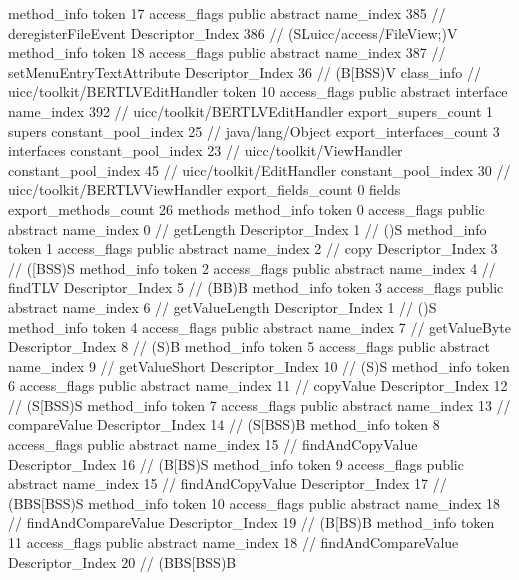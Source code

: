{{{{{				}
				method_info {
					token	17
					access_flags	public abstract
					name_index	385		// deregisterFileEvent
					Descriptor_Index	386		// (SLuicc/access/FileView;)V
				}
				method_info {
					token	18
					access_flags	public abstract
					name_index	387		// setMenuEntryTextAttribute
					Descriptor_Index	36		// (B[BSS)V
				}
			}
		}
		class_info {		// uicc/toolkit/BERTLVEditHandler
			token	10
			access_flags	public abstract interface
			name_index	392		// uicc/toolkit/BERTLVEditHandler
			export_supers_count	1
			supers {
				constant_pool_index	25		// java/lang/Object
			}
			export_interfaces_count	3
			interfaces {
				constant_pool_index	23		// uicc/toolkit/ViewHandler
				constant_pool_index	45		// uicc/toolkit/EditHandler
				constant_pool_index	30		// uicc/toolkit/BERTLVViewHandler
			}
			export_fields_count	0
			fields {
			}
			export_methods_count	26
			methods {
				method_info {
					token	0
					access_flags	public abstract
					name_index	0		// getLength
					Descriptor_Index	1		// ()S
				}
				method_info {
					token	1
					access_flags	public abstract
					name_index	2		// copy
					Descriptor_Index	3		// ([BSS)S
				}
				method_info {
					token	2
					access_flags	public abstract
					name_index	4		// findTLV
					Descriptor_Index	5		// (BB)B
				}
				method_info {
					token	3
					access_flags	public abstract
					name_index	6		// getValueLength
					Descriptor_Index	1		// ()S
				}
				method_info {
					token	4
					access_flags	public abstract
					name_index	7		// getValueByte
					Descriptor_Index	8		// (S)B
				}
				method_info {
					token	5
					access_flags	public abstract
					name_index	9		// getValueShort
					Descriptor_Index	10		// (S)S
				}
				method_info {
					token	6
					access_flags	public abstract
					name_index	11		// copyValue
					Descriptor_Index	12		// (S[BSS)S
				}
				method_info {
					token	7
					access_flags	public abstract
					name_index	13		// compareValue
					Descriptor_Index	14		// (S[BSS)B
				}
				method_info {
					token	8
					access_flags	public abstract
					name_index	15		// findAndCopyValue
					Descriptor_Index	16		// (B[BS)S
				}
				method_info {
					token	9
					access_flags	public abstract
					name_index	15		// findAndCopyValue
					Descriptor_Index	17		// (BBS[BSS)S
				}
				method_info {
					token	10
					access_flags	public abstract
					name_index	18		// findAndCompareValue
					Descriptor_Index	19		// (B[BS)B
				}
				method_info {
					token	11
					access_flags	public abstract
					name_index	18		// findAndCompareValue
					Descriptor_Index	20		// (BBS[BSS)B
}}}}}
